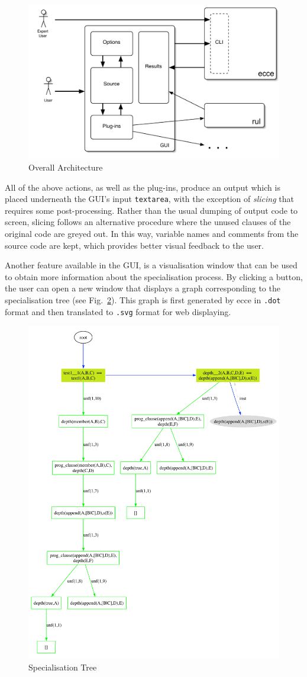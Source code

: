 \documentclass{sig-alternate}
\begin{document}
\begin{figure}[!ht]
  \centering
  \includegraphics[width=.45\textwidth]{web_ecce}
  \caption{Overall Architecture}\label{fig:php_arch}
\end{figure} 

All of the above actions, as well as the plug-ins, produce an output which is placed underneath the GUI's input \verb!textarea!, with the exception of {\em slicing} that requires some post-processing. Rather than the usual dumping of output code to screen, slicing follows an alternative procedure where the unused clauses of the original code are greyed out. In this way, variable names and comments from the source code are kept, which provides
 better visual feedback to the user.

Another feature available in the GUI, is a visualisation window that can be used to obtain more information about the specialisation process.
By clicking a button, the user can open a new window that displays a graph corresponding to the specialisation tree (see Fig.~\ref{fig:svg}). This graph is 
 first generated by {\sc ecce} in {\tt .dot} format and then  translated to {\tt .svg} format for web displaying.

\begin{figure}[!ht]
  \centering
  \includegraphics[width=.5\textwidth]{Spectree}
  \caption{Specialisation Tree}\label{fig:svg}
\end{figure} 
\end{document}

